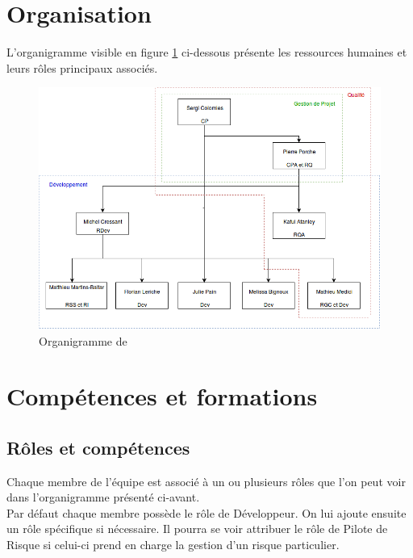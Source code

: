 \section{Organisation} \label{Organisation}

L'organigramme visible en figure \ref{organigramme} ci-dessous présente les ressources humaines et leurs rôles principaux associés.

\begin{figure}[H]
   \centering
   \includegraphics[width=15cm]{images/organigramme.png}
   \caption{\label{organigramme} Organigramme de \nomEquipe}
\end{figure}

\section{Compétences et formations} \label{CompetencesEtFormations}
\subsection{Rôles et compétences} \label{RolesEtCompetences}

\indent Chaque membre de l'équipe \nomEquipe{} est associé à un ou plusieurs rôles que l’on peut voir dans l’organigramme présenté ci-avant.\\

\indent Par défaut chaque membre possède le rôle de Développeur. On lui ajoute ensuite un rôle spécifique si nécessaire. Il pourra se voir attribuer le rôle de Pilote de Risque si celui-ci prend en charge la gestion d’un risque particulier.\\ 

